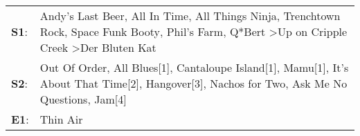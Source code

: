 \begin{supertabular}{p{0.03\textwidth}p{0.92\textwidth}}
 \textbf{S1}:  &  Andy's Last Beer\textsuperscript{}, \enspace All In Time\textsuperscript{}, \enspace All Things Ninja\textsuperscript{}, \enspace Trenchtown Rock\textsuperscript{}, \enspace Space Funk Booty\textsuperscript{}, \enspace Phil's Farm\textsuperscript{}, \enspace Q*Bert\textsuperscript{} \textgreater \enspace Up on Cripple Creek\textsuperscript{} \textgreater \enspace Der Bluten Kat\textsuperscript{}  \enspace  \\
 \textbf{S2}:  &                          Out Of Order\textsuperscript{}, \enspace All Blues[1]\textsuperscript{}, \enspace Cantaloupe Island[1]\textsuperscript{}, \enspace Mamu[1]\textsuperscript{}, \enspace It's About That Time[2]\textsuperscript{}, \enspace Hangover[3]\textsuperscript{}, \enspace Nachos for Two\textsuperscript{}, \enspace Ask Me No Questions\textsuperscript{}, \enspace Jam[4]\textsuperscript{}  \enspace  \\
 \textbf{E1}:  &                                                                                                                                                                                                                                                                                                                                                                                      Thin Air\textsuperscript{}  \enspace  \\
\end{supertabular}
